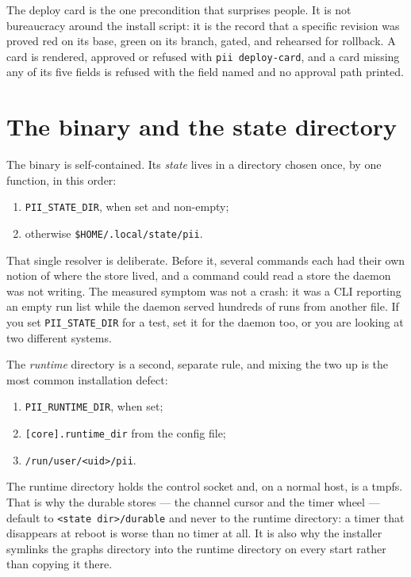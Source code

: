 The deploy card is the one precondition that surprises people. It is not bureaucracy
around the install script: it is the record that a specific revision was proved red on
its base, green on its branch, gated, and rehearsed for rollback. A card is rendered,
approved or refused with \texttt{pii deploy-card}, and a card missing any of its five
fields is refused with the field named and no approval path printed.

\section{The binary and the state directory}

The binary is self-contained. Its \emph{state} lives in a directory chosen once, by one
function, in this order:

\begin{enumerate}
	\item \texttt{PII\_STATE\_DIR}, when set and non-empty;
	\item otherwise \texttt{\$HOME/.local/state/pii}.
\end{enumerate}

That single resolver is deliberate. Before it, several commands each had their own notion
of where the store lived, and a command could read a store the daemon was not writing.
The measured symptom was not a crash: it was a CLI reporting an empty run list while the
daemon served hundreds of runs from another file. If you set \texttt{PII\_STATE\_DIR} for
a test, set it for the daemon too, or you are looking at two different systems.

The \emph{runtime} directory is a second, separate rule, and mixing the two up is the most
common installation defect:

\begin{enumerate}
	\item \texttt{PII\_RUNTIME\_DIR}, when set;
	\item \texttt{[core].runtime\_dir} from the config file;
	\item \texttt{/run/user/\textless{}uid\textgreater{}/pii}.
\end{enumerate}

The runtime directory holds the control socket and, on a normal host, is a tmpfs. That is
why the durable stores --- the channel cursor and the timer wheel --- default to
\texttt{\textless{}state dir\textgreater{}/durable} and never to the runtime directory: a timer
that disappears at
reboot is worse than no timer at all. It is also why the installer symlinks the graphs
directory into the runtime directory on every start rather than copying it there.

